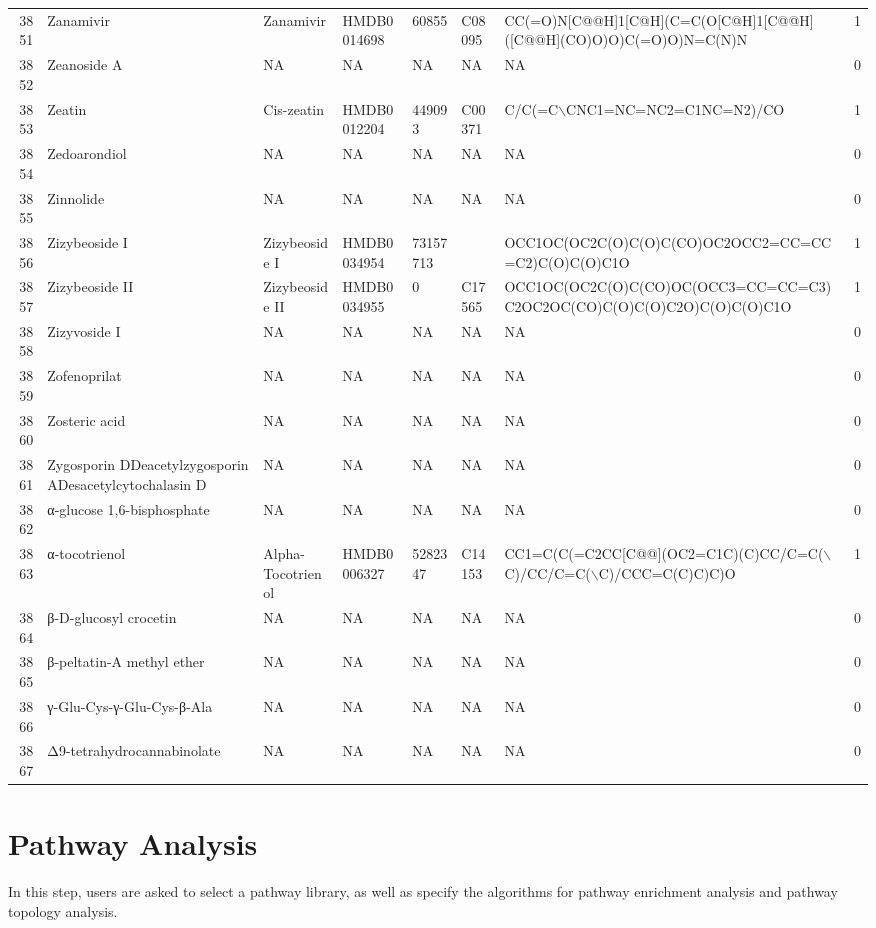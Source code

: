 \documentclass[a4paper]{article}
\begin{document}
\begin{longtable}{rlllllll}
  3851 & Zanamivir & Zanamivir & HMDB0014698 & 60855 & C08095 & CC(=O)N[C@@H]1[C@H](C=C(O[C@H]1[C@@H]([C@@H](CO)O)O)C(=O)O)N=C(N)N & 1 \\ 
  3852 & Zeanoside A & NA & NA & NA & NA & NA & 0 \\ 
  3853 & Zeatin & Cis-zeatin & HMDB0012204 & 449093 & C00371 & C/C(=C$\backslash$CNC1=NC=NC2=C1NC=N2)/CO & 1 \\ 
  3854 & Zedoarondiol & NA & NA & NA & NA & NA & 0 \\ 
  3855 & Zinnolide & NA & NA & NA & NA & NA & 0 \\ 
  3856 & Zizybeoside I & Zizybeoside I & HMDB0034954 & 73157713 &  & OCC1OC(OC2C(O)C(O)C(CO)OC2OCC2=CC=CC=C2)C(O)C(O)C1O & 1 \\ 
  3857 & Zizybeoside II & Zizybeoside II & HMDB0034955 & 0 & C17565 & OCC1OC(OC2C(O)C(CO)OC(OCC3=CC=CC=C3)C2OC2OC(CO)C(O)C(O)C2O)C(O)C(O)C1O & 1 \\ 
  3858 & Zizyvoside I & NA & NA & NA & NA & NA & 0 \\ 
  3859 & Zofenoprilat & NA & NA & NA & NA & NA & 0 \\ 
  3860 & Zosteric acid & NA & NA & NA & NA & NA & 0 \\ 
  3861 & Zygosporin DDeacetylzygosporin ADesacetylcytochalasin D & NA & NA & NA & NA & NA & 0 \\ 
  3862 & α-glucose 1,6-bisphosphate & NA & NA & NA & NA & NA & 0 \\ 
  3863 & α-tocotrienol & Alpha-Tocotrienol & HMDB0006327 & 5282347 & C14153 & CC1=C(C(=C2CC[C@@](OC2=C1C)(C)CC/C=C($\backslash$C)/CC/C=C($\backslash$C)/CCC=C(C)C)C)O & 1 \\ 
  3864 & β-D-glucosyl crocetin & NA & NA & NA & NA & NA & 0 \\ 
  3865 & β-peltatin-A methyl ether & NA & NA & NA & NA & NA & 0 \\ 
  3866 & γ-Glu-Cys-γ-Glu-Cys-β-Ala & NA & NA & NA & NA & NA & 0 \\ 
  3867 & Δ9-tetrahydrocannabinolate & NA & NA & NA & NA & NA & 0 \\ 
   \hline
\hline
\end{longtable}
\endgroup\clearpage


\section{Pathway Analysis}

In this step, users are asked to select a pathway library, as well as specify the algorithms for pathway
enrichment analysis and pathway topology analysis. 
\end{document}
